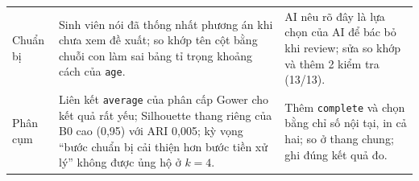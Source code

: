 \begin{longtable}{>{\raggedright\arraybackslash}p{1.8cm}>{\raggedright\arraybackslash}p{6.7cm}>{\raggedright\arraybackslash}p{6.1cm}}
Chuẩn bị & Sinh viên nói đã thống nhất phương án khi chưa xem đề xuất; so khớp tên cột bằng chuỗi con làm sai bảng tỉ trọng khoảng cách của \texttt{age}. & AI nêu rõ đây là lựa chọn của AI để bác bỏ khi review; sửa so khớp và thêm 2 kiểm tra (13/13).\\
Phân cụm & Liên kết \texttt{average} của phân cấp Gower cho kết quả rất yếu; Silhouette thang riêng của B0 cao (0,95) với ARI 0,005; kỳ vọng ``bước chuẩn bị cải thiện hơn bước tiền xử lý'' không được ủng hộ ở $k=4$. & Thêm \texttt{complete} và chọn bằng chỉ số nội tại, in cả hai; so ở thang chung; ghi đúng kết quả đo.\\
\end{longtable}
\endgroup
\FloatBarrier
